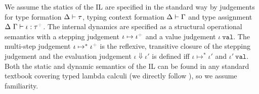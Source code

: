 \documentclass[10pt,preprint]{sigplanconf}
\newcommand{\moutput}{^{\color{gray}+}}
\begin{document}
We assume the statics of the IL are specified in the standard way by judgements for  type formation {$\Delta \vdash \tau$}, typing context formation { $\Delta \vdash \Gamma$} and type assignment {$\iDelta~\iGamma \vdash \iota : \tau\moutput$}. 
The internal dynamics are specified as a structural operational semantics with a stepping judgement {\small $\iota \mapsto \iota\moutput$} and a value judgement {$\iota~\mathtt{val}$}. The multi-step judgement $\iota \mapsto^{*} \iota\moutput$ is the reflexive, transitive closure of the stepping judgement and the evaluation judgement $\iota \Downarrow \iota'$ is defined iff $\iota \mapsto^{*} \iota'$ and $\iota'~\mathtt{val}$. Both the static and dynamic semantics of the IL can be found in any standard textbook covering typed lambda calculi (we directly follow \cite{pfpl}), so we assume familiarity.

\end{document}
